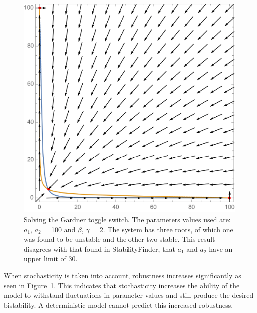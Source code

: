\begin{figure}[h]
\centering
\includegraphics[scale=0.2]{chapterModelling/images/Gardner/gardner_solve_roots_a1a2_big.png}
\caption[Solving the Gardner toggle switch.]{Solving the Gardner toggle switch. The parameters values used are:  $a_1$, $a_2$ = 100 and $\beta$, $\gamma$ = 2. The system has three roots, of which one was found to be unstable and the other two stable. This result disagrees with that found in StabilityFinder, that $a_1$ and $a_2$ have an upper limit of 30.}
\label{fig:Gard_robst}
\end{figure}

 When stochasticity is taken into account, robustness increases significantly as seen in Figure~\ref{fig:Gard_robst}. This indicates that stochasticity increases the ability of the model to withstand fluctuations in parameter values and still produce the desired bistability. A deterministic model cannot predict this increased robustness.
 
